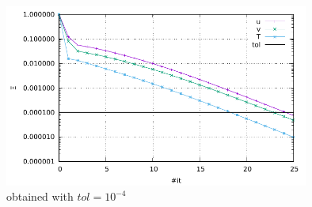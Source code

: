 \begin{center}
\includegraphics[width=10cm]{python_codes/fieldstone_68/results/case2a/conv.pdf}\\
{\captionfont obtained with $tol=10^{-4}$}
\end{center}

